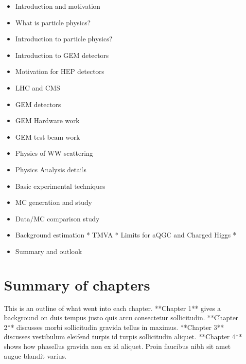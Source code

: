 \begin{itemize}
\item Introduction and motivation     
\item What is particle physics?     
\item Introduction to particle physics?
\item Introduction to GEM detectors 
\item Motivation for HEP detectors
\item LHC and CMS 
\item GEM detectors 
\item GEM Hardware work
\item GEM test beam work
\item Physics of WW scattering  
\item Physics Analysis details     
\item Basic experimental techniques     
\item MC generation and study     
\item Data/MC comparison study    
\item Background estimation     * TMVA     * Limits for aQGC and Charged Higgs *
\item Summary and outlook
\end{itemize}

\section{Summary of chapters}

This is an outline of what went into each chapter. **Chapter 1** gives a
background on duis tempus justo quis arcu consectetur sollicitudin.  **Chapter
2** discusses morbi sollicitudin gravida tellus in maximus.  **Chapter 3**
discusses vestibulum eleifend turpis id turpis sollicitudin aliquet.  **Chapter
4** shows how phasellus gravida non ex id aliquet. Proin faucibus nibh sit amet
augue blandit varius.
